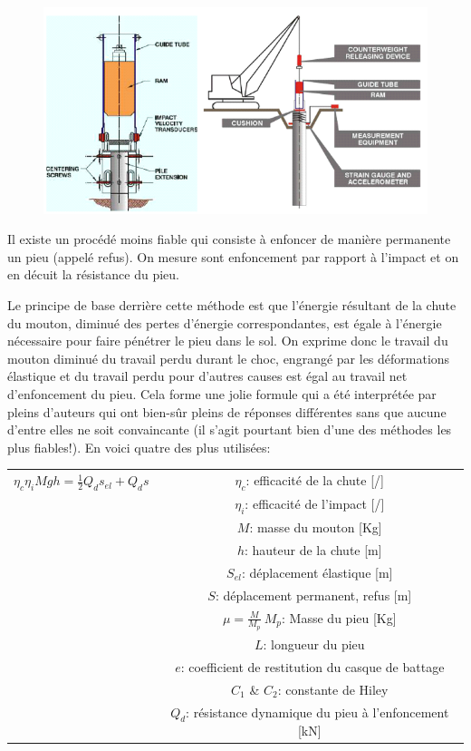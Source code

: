         \begin{figure} [h!]
            \centering
            \includegraphics[scale=0.8]{Holeyman/images/H38.PNG}
        \end{figure}
        
        Il existe un procédé moins fiable qui consiste à enfoncer de manière permanente un pieu (appelé refus). On mesure sont enfoncement par rapport à l'impact et on en décuit la résistance du pieu.
        
        Le principe de base derrière cette méthode est que l'énergie résultant de la chute du mouton, diminué des pertes d'énergie correspondantes, est égale à l'énergie nécessaire pour faire pénétrer le pieu dans le sol. On exprime donc le travail du mouton diminué du travail perdu durant le choc, engrangé par les déformations élastique et du travail perdu pour d'autres causes est égal au travail net d'enfoncement du pieu. Cela forme une jolie formule qui a été interprétée par pleins d'auteurs qui ont bien-sûr pleins de réponses différentes sans que aucune d'entre elles ne soit convaincante (il s'agit pourtant bien d'une des méthodes les plus fiables!). En voici quatre des plus utilisées: 
        
        \begin{center}
        \begin{tabular}{c|c}
            $\eta_c \eta_i Mgh = \frac{1}{2} Q_d s_{el} + Q_d s$ \: \: \:
            &  $\eta_c$: efficacité de la chute [/]  \\
            &  $\eta_i$: efficacité de l'impact [/]  \\
            &  $M$: masse du mouton [Kg]  \\
            &  $h$: hauteur de la chute [m]  \\
            &  $S_{el}$: déplacement élastique [m]  \\
            &  $S$: déplacement permanent, refus [m]  \\
            &  $\mu = \frac{M}{M_p} \: M_p$: Masse du pieu [Kg]  \\
            &  $L$: longueur du pieu  \\
            &  $e$: coefficient de restitution du casque de battage  \\
            &  $C_1$ \& $C_2$: constante de Hiley  \\
            &  $Q_d$: résistance dynamique du pieu à l'enfoncement [kN]  
        \end{tabular}
        \end{center} 
        
